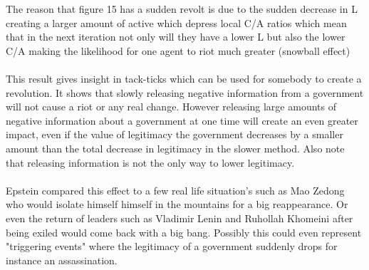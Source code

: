 \documentclass[11pt]{article}
\begin{document}
	The reason that figure 15 has a sudden revolt is due to the sudden decrease in L creating a larger amount of active which depress local C/A ratios which mean that in the next iteration not only will they have a lower L but also the lower C/A making the likelihood for one agent to riot much greater (snowball effect)\\
	\\
	This result gives insight in tack-ticks which can be used for somebody to create a revolution. It shows that slowly releasing negative information from a government will not cause a riot or any real change. However releasing large amounts of negative information about a government at one time will create an even greater impact, even if the value of legitimacy the government decreases by a smaller amount than the total decrease in legitimacy in the slower method. Also note that releasing information is not the only way to lower legitimacy.\\
	\\
	Epstein compared this effect to a few real life situation's such as Mao Zedong who would isolate himself himself in the mountains for a big reappearance. Or even the return of leaders such as Vladimir Lenin and Ruhollah Khomeini after being exiled would come back with a big bang. Possibly this could even represent "triggering events" where the legitimacy of a government suddenly drops for instance an assassination.
	
\end{document}
